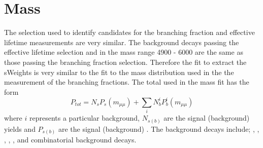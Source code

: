 
\section{Mass \pdfs}
\label{sec:ELmasspdfs}
The selection used to identify \bsmumu candidates for the \bmumu branching fraction and \bsmumu effective lifetime measurements are very similar. 
The background decays passing the \bsmumu effective lifetime selection and in the mass range 4900 - 6000 \mevcc are the same as those passing the branching fraction selection. Therefore the \ml fit to extract the sWeights is very similar to the fit to the mass distribution used in the the measurement of the \bmumu branching fractions. The total \pdf used in the mass fit has the form
\begin{equation}
P_{tot} = N_{s}P_{s}(m_{\mu \mu}) + \displaystyle\sum_{i} N^i_{b}P^i_{b}(m_{\mu \mu})
\end{equation}
where $i$ represents a particular background, $N_{s(b)}$ are the signal (background) yields and $P_{s(b)}$ are the signal (background) \pdfs. The background decays include; \bdmumu, \lambdab, \bdpimunu, \bsKmunu, \bpimumu, \bcjpsimunu and combinatorial background decays. %


